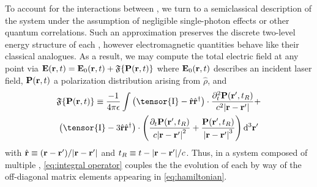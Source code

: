 To account for the interactions between \qds{}, we turn to a semiclassical description of the system under the assumption of negligible single-photon effects or other quantum correlations.
Such an approximation preserves the discrete two-level energy structure of each \qd{}, however electromagnetic quantities behave like their classical analogues.
As a result, we may compute the total electric field at any point via $\vb{E}(\vb{r}, t) = \vb{E}_0(\vb{r}, t) + \mathfrak{F}\{ \vb{P}(\vb{r}, t) \}$
where $\vb{E}_0(\vb{r}, t)$ describes an incident laser field, $\vb{P}(\vb{r}, t)$ a polarization distribution arising from $\hat{\rho}$, and
\begin{equation}
  \begin{gathered}
    \mathfrak{F}\{\vb{P}(\vb{r}, t)\} \equiv
      \frac{-1}{4\pi \epsilon} \int
      \left(\tensor{\mathrm{I}} -  \hat{\mathbf{r}}\hat{\mathbf{r}}^\dagger\right) \cdot \frac{\partial_t^2 \mathbf{P}(\mathbf{r}', t_R)}{c^2 \abs{\mathbf{r}-\mathbf{r}'}} + \\
      \left(\tensor{\mathrm{I}} - 3\hat{\mathbf{r}}\hat{\mathbf{r}}^\dagger\right) \cdot \qty(
        \frac{\partial_t   \mathbf{P}(\mathbf{r}', t_R)}{c \abs{\mathbf{r}-\mathbf{r}'}^2} +
        \frac{             \mathbf{P}(\mathbf{r}', t_R)}{  \abs{\mathbf{r}-\mathbf{r}'}^3}
      )
    \, \mathrm{d}^3 \mathbf{r'}
  \end{gathered}
  \label{eq:integral operator}
\end{equation}
with $\hat{\vb{r}} \equiv \qty(\vb{r} - \vb{r}')/\abs{\vb{r} - \vb{r}'}$ and $t_R \equiv t - \abs{\vb{r} - \vb{r}'}/c$.
Thus, in a system composed of multiple \qds{}, \cref{eq:integral operator} couples the the evolution of each \qd{} by way of the off-diagonal matrix elements appearing in \cref{eq:hamiltonian}.
